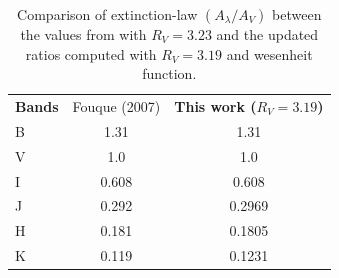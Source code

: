 \begin{table}[H]
  \centering
  \caption{Comparison of extinction-law $\left(A_{\lambda}/A_V\right)$ between the values from \cite{2007fouque} with $R_V = 3.23$ and the updated ratios computed with $R_V = 3.19$ and wesenheit function.}\label{exlaw}
  {\small
  \begin{tabular}{lcc}
    \textbf{Bands} & Fouque (2007) & \textbf{This work ($R_V = 3.19$)}\\
	B & 1.31 & 1.31 \\
	V & 1.0 & 1.0 \\
	I & 0.608 & 0.608 \\
	J & 0.292 & 0.2969 \\
	H & 0.181 & 0.1805 \\
	K & 0.119 & 0.1231 \\
 \end{tabular}
 }
\end{table}


